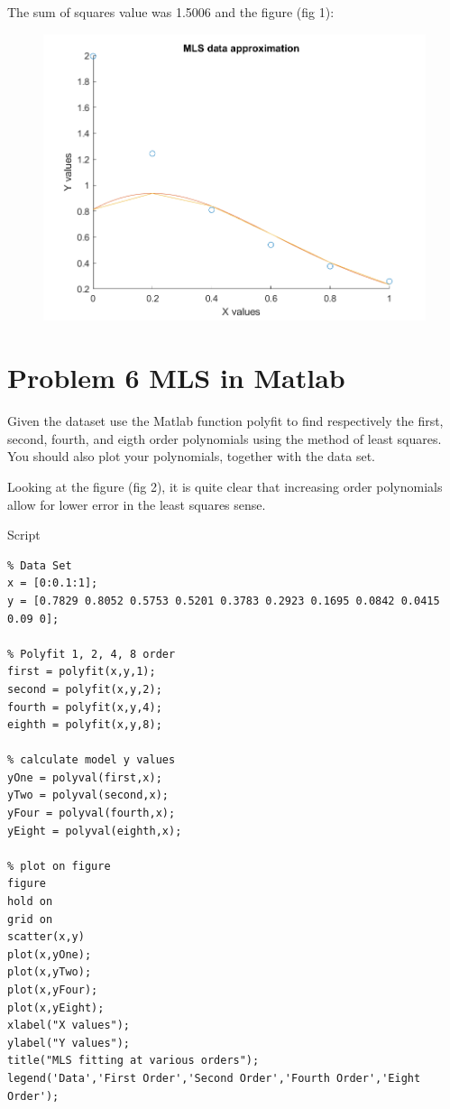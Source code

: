 \documentclass[]{article}
\begin{document}
The sum of squares value was 1.5006 and the figure (fig 1):

\begin{figure}
\centering
\includegraphics{./Problem5Fig.png}
\caption{}
\end{figure}

\section{Problem 6 MLS in Matlab}\label{problem-6-mls-in-matlab}

Given the dataset use the Matlab function polyfit to find respectively
the first, second, fourth, and eigth order polynomials using the method
of least squares. You should also plot your polynomials, together with
the data set.

Looking at the figure (fig 2), it is quite clear that increasing order
polynomials allow for lower error in the least squares sense.

Script

\begin{verbatim}
% Data Set
x = [0:0.1:1];
y = [0.7829 0.8052 0.5753 0.5201 0.3783 0.2923 0.1695 0.0842 0.0415 0.09 0];

% Polyfit 1, 2, 4, 8 order
first = polyfit(x,y,1);
second = polyfit(x,y,2);
fourth = polyfit(x,y,4);
eighth = polyfit(x,y,8);

% calculate model y values
yOne = polyval(first,x);
yTwo = polyval(second,x);
yFour = polyval(fourth,x);
yEight = polyval(eighth,x);

% plot on figure
figure
hold on
grid on
scatter(x,y)
plot(x,yOne);
plot(x,yTwo);
plot(x,yFour);
plot(x,yEight);
xlabel("X values");
ylabel("Y values");
title("MLS fitting at various orders");
legend('Data','First Order','Second Order','Fourth Order','Eight Order');
\end{verbatim}
\end{document}
